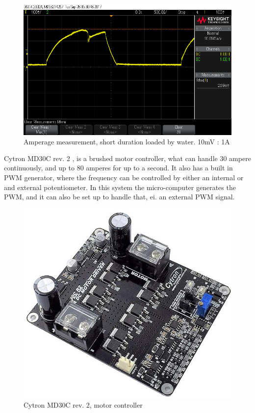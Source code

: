 \begin{figure}[H]
\centering
\includegraphics[width=0.7\linewidth]{Images/Design/motor_amperage_test}
\caption{Amperage measurement, short duration loaded by water. 10mV : 1A}
\label{fig:motoramperagetest}
\end{figure}

Cytron MD30C rev. 2 \cite{md30}, is a brushed motor controller, what can handle 30 ampere continuously, and up to 80 amperes for up to a second. It also has a built in PWM generator, where the frequency can be controlled by either an internal or and external potentiometer. In this system the micro-computer generates the PWM, and it can also be set up to handle that, ei. an external PWM signal.

\begin{figure}[H]
\centering
\includegraphics[width=0.7\linewidth]{Images/Design/cytron}
\caption{Cytron MD30C rev. 2, motor controller}
\label{fig:cytron}
\end{figure}

